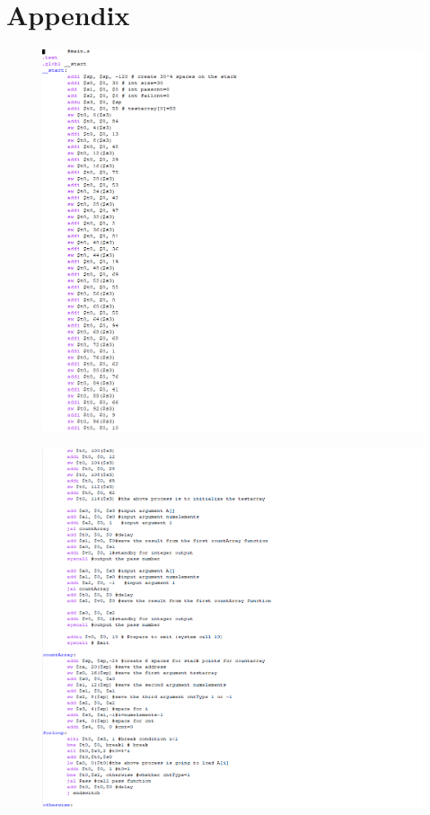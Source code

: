 \documentclass[12pt]{article}
\begin{document}
\section{Appendix}
\begin{figure}[H]
\centering
\includegraphics[scale=0.6]{mips1.png}
\end{figure}
\begin{figure}[H]
\centering
\includegraphics[scale=0.6]{mips2.png}
\end{figure}
\end{document}
